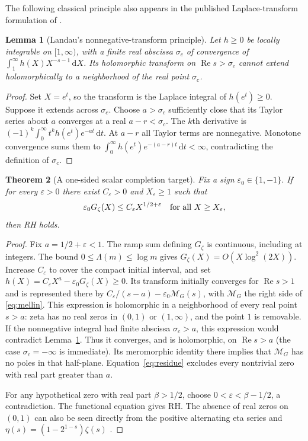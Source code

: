 \documentclass[11pt,letterpaper]{article}
\newtheorem{theorem}{Theorem}[section]
\newtheorem{lemma}[theorem]{Lemma}
\theoremstyle{definition}
\theoremstyle{remark}
\newcommand{\dd}{\,\mathrm d}
\newcommand{\Rea}{\operatorname{Re}}
\numberwithin{equation}{section}
\begin{document}
The following classical principle also appears in the published Laplace-transform formulation of \cite{landau}.
\begin{lemma}[Landau's nonnegative-transform principle]\label{lem:landau}
Let $h\ge0$ be locally integrable on $[1,\infty)$, with a finite real abscissa $\sigma_c$ of convergence of $\int_1^\infty h(X)X^{-s-1}\dd X$. Its holomorphic transform on $\Rea s>\sigma_c$ cannot extend holomorphically to a neighborhood of the real point $\sigma_c$.
\end{lemma}
\begin{proof}
Set $X=e^t$, so the transform is the Laplace integral of $h(e^t)\ge0$. Suppose it extends across $\sigma_c$. Choose $a>\sigma_c$ sufficiently close that its Taylor series about $a$ converges at a real $a-r<\sigma_c$. The $k$th derivative is $(-1)^k\int_0^\infty t^kh(e^t)e^{-at}\dd t$. At $a-r$ all Taylor terms are nonnegative. Monotone convergence sums them to $\int_0^\infty h(e^t)e^{-(a-r)t}\dd t<\infty$, contradicting the definition of $\sigma_c$.
\end{proof}

\begin{theorem}[A one-sided scalar completion target]\label{thm:landau}
Fix a sign $\varepsilon_0\in\{1,-1\}$. If for every $\varepsilon>0$ there exist $C_\varepsilon>0$ and $X_\varepsilon\ge1$ such that
\begin{equation}\label{eq:scalar-open}
 \varepsilon_0G_\zeta(X)\le C_\varepsilon X^{1/2+\varepsilon}
 \quad\hbox{for all }X\ge X_\varepsilon,
\end{equation}
then RH holds.
\end{theorem}
\begin{proof}
Fix $a=1/2+\varepsilon<1$. The ramp sum defining $G_\zeta$ is continuous, including at integers. The bound $0\le\Lambda(m)\le\log m$ gives $G_\zeta(X)=O(X\log^2(2X))$. Increase $C_\varepsilon$ to cover the compact initial interval, and set $h(X)=C_\varepsilon X^a-\varepsilon_0G_\zeta(X)\ge0$. Its transform initially converges for $\Rea s>1$ and is represented there by
$C_\varepsilon/(s-a)-\varepsilon_0\mathcal M_G(s)$, with $\mathcal M_G$ the right side of \eqref{eq:mellin}. This expression is holomorphic in a neighborhood of every real point $s>a$: zeta has no real zeros in $(0,1)$ or $(1,\infty)$, and the point $1$ is removable. If the nonnegative integral had finite abscissa $\sigma_c>a$, this expression would contradict Lemma~\ref{lem:landau}. Thus it converges, and is holomorphic, on $\Rea s>a$ (the case $\sigma_c=-\infty$ is immediate). Its meromorphic identity there implies that $\mathcal M_G$ has no poles in that half-plane. Equation~\eqref{eq:residue} excludes every nontrivial zero with real part greater than $a$.

For any hypothetical zero with real part $\beta>1/2$, choose $0<\varepsilon<\beta-1/2$, a contradiction. The functional equation gives RH. The absence of real zeros on $(0,1)$ can also be seen directly from the positive alternating eta series and $\eta(s)=(1-2^{1-s})\zeta(s)$ \cite{dlmfseries}.
\end{proof}
\end{document}
